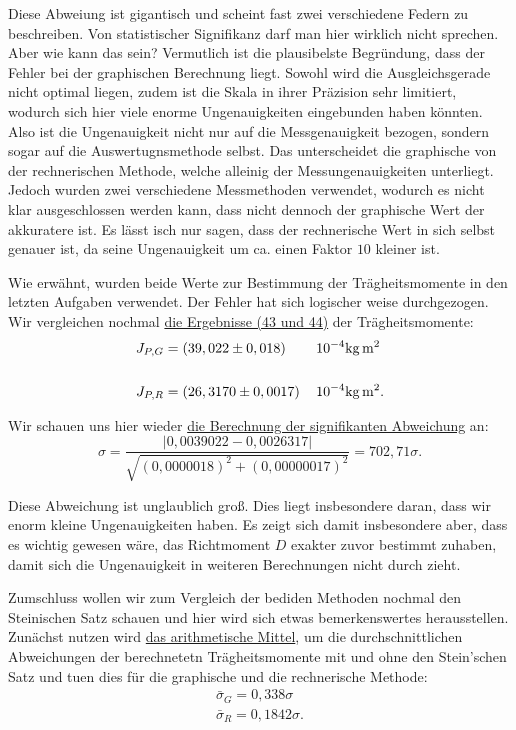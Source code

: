 Diese Abweiung ist gigantisch und scheint fast zwei verschiedene Federn zu beschreiben. Von statistischer Signifikanz darf man hier wirklich nicht sprechen. Aber wie kann das sein?
Vermutlich ist die plausibelste Begründung, dass der Fehler bei der graphischen Berechnung liegt. Sowohl wird die Ausgleichsgerade nicht optimal liegen, zudem ist die Skala in ihrer Präzision sehr limitiert,
wodurch sich hier viele enorme Ungenauigkeiten eingebunden haben könnten. Also ist die Ungenauigkeit nicht nur auf die Messgenauigkeit bezogen, sondern sogar auf die Auswertugnsmethode selbst. 
Das unterscheidet die graphische von der rechnerischen Methode, welche alleinig der Messungenauigkeiten unterliegt. Jedoch wurden zwei verschiedene Messmethoden verwendet, wodurch es nicht klar 
ausgeschlossen werden kann, dass nicht dennoch der graphische Wert der akkuratere ist. Es lässt isch nur sagen, dass der rechnerische Wert in sich selbst genauer ist, da seine Ungenauigkeit um ca. einen Faktor $10$ kleiner ist.

Wie erwähnt, wurden beide Werte zur Bestimmung der Trägheitsmomente in den letzten Aufgaben verwendet. Der Fehler hat sich logischer weise durchgezogen. Wir vergleichen nochmal \hyperref[e:s_t]{die Ergebnisse (43 und 44)} der Trägheitsmomente:
\begin{align}
    J_{P,G} &= (39,022 \pm 0,018)\, &&\mathrm{10^{-4}kg \, m^2} \\
        \notag \\
    J_{P,R} &= (26,3170 \pm 0,0017 )\, &&\mathrm{10^{-4} kg \, m^2}.
\end{align}

Wir schauen uns hier wieder \hyperref[eq:signifikante_abweichung]{die Berechnung der signifikanten Abweichung} an:
\begin{equation}
    \sigma = \frac{\left| 0,0039022 - 0,0026317\right|}{\sqrt{(0,0000018)^2 + (0,00000017)^2}} = 702,71\sigma.
\end{equation}

Diese Abweichung ist unglaublich groß. Dies liegt insbesondere daran, dass wir enorm kleine Ungenauigkeiten haben. Es zeigt sich damit insbesondere aber, dass es wichtig gewesen wäre, das Richtmoment $D$ exakter 
zuvor bestimmt zuhaben, damit sich die Ungenauigkeit in weiteren Berechnungen nicht durch zieht.

Zumschluss wollen wir zum Vergleich der bediden Methoden nochmal den Steinischen Satz schauen und hier wird sich etwas bemerkenswertes herausstellen. Zunächst nutzen wird \hyperref[eq:arithmetisches_mittel]{das arithmetische Mittel}, um die durchschnittlichen Abweichungen 
der berechnetetn Trägheitsmomente mit und ohne den Stein'schen Satz und tuen dies für die graphische und die rechnerische Methode:
\begin{align}
    \bar{\sigma}_G = 0,338\sigma \\
    \bar{\sigma}_R = 0,1842\sigma.
\end{align}


